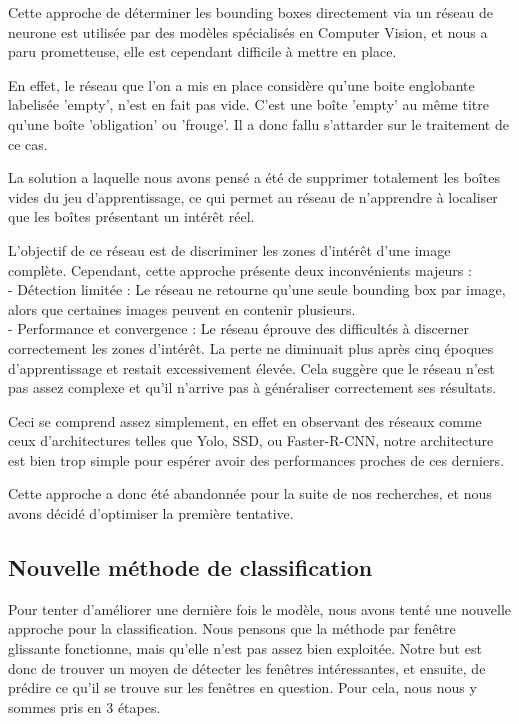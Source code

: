 \documentclass[twocolumn,10pt]{article}
\begin{document}
    Cette approche de déterminer les bounding boxes directement via un réseau de neurone est utilisée par des modèles spécialisés en Computer Vision, et nous a paru prometteuse, elle est cependant difficile à mettre en place.

    En effet, le réseau que l'on a mis en place considère qu'une boite englobante labelisée 'empty', n'est en fait pas vide. C'est une boîte 'empty' au même titre qu'une boîte 'obligation' ou 'frouge'. Il a donc fallu s'attarder sur le traitement de ce cas.

    La solution a laquelle nous avons pensé a été de supprimer totalement les boîtes vides du jeu d'apprentissage, ce qui permet au réseau de n'apprendre à localiser que les boîtes présentant un intérêt réel.

    L'objectif de ce réseau est de discriminer les zones d'intérêt d'une image complète. Cependant, cette approche présente deux inconvénients majeurs :\\
    - Détection limitée : Le réseau ne retourne qu'une seule bounding box par image, alors que certaines images peuvent en contenir plusieurs.\\
    - Performance et convergence : Le réseau éprouve des difficultés à discerner correctement les zones d'intérêt. La perte ne diminuait plus après cinq époques d'apprentissage et restait excessivement élevée. Cela suggère que le réseau n'est pas assez complexe et qu'il n'arrive pas à généraliser correctement ses résultats.

    Ceci se comprend assez simplement, en effet en observant des réseaux comme ceux d'architectures telles que Yolo, SSD, ou Faster-R-CNN, notre architecture est bien trop simple pour espérer avoir des performances proches de ces derniers.

    Cette approche a donc été abandonnée pour la suite de nos recherches, et nous avons décidé d'optimiser la première tentative.

    \subsection{Nouvelle méthode de classification}

    Pour tenter d'améliorer une dernière fois le modèle, nous avons tenté une nouvelle approche pour la classification. Nous pensons que la méthode par fenêtre glissante fonctionne, mais qu'elle n'est pas assez bien exploitée. Notre but est donc de trouver un moyen de détecter les fenêtres intéressantes, et ensuite, de prédire ce qu'il se trouve sur les fenêtres en question. Pour cela, nous nous y sommes pris en 3 étapes.
\end{document}
